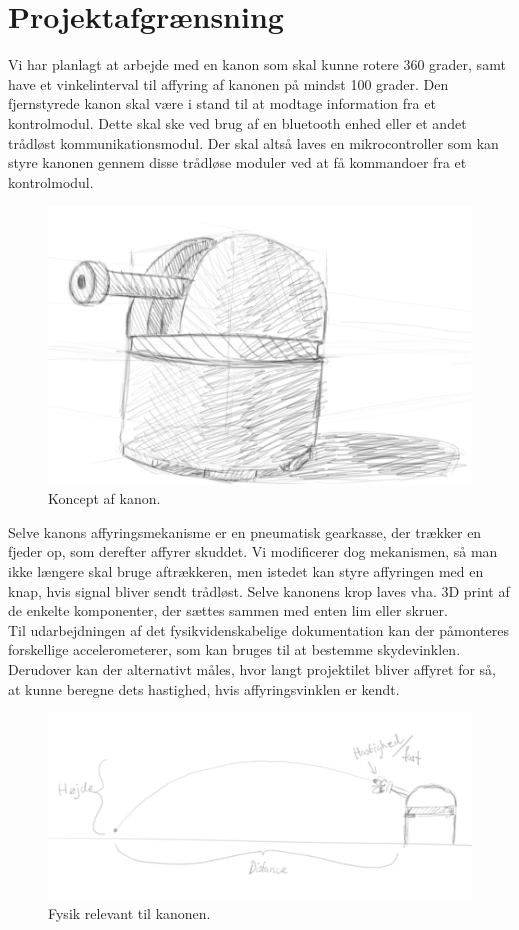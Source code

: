 \section{Projektafgrænsning}

Vi har planlagt at arbejde med en kanon som skal kunne rotere 360 grader, samt have et vinkelinterval til affyring af kanonen på mindst 100 grader. Den fjernstyrede kanon skal være i stand til at modtage information fra et kontrolmodul. Dette skal ske ved brug af en bluetooth enhed eller et andet trådløst kommunikationsmodul. Der skal altså laves en mikrocontroller som kan styre kanonen gennem disse trådløse moduler ved at få kommandoer fra et kontrolmodul.\\

\begin{figure}[H]
\centering
\includegraphics[scale=0.4]{Billeder/Koncept_turret.png}
\caption{Koncept af kanon.}
\label{fig:KonceptKanon}
\end{figure}

Selve kanons affyringsmekanisme er en pneumatisk gearkasse, der trækker en fjeder op, som derefter affyrer skuddet. Vi modificerer dog mekanismen, så man ikke længere skal bruge aftrækkeren, men istedet kan styre affyringen med en knap, hvis signal bliver sendt trådløst. Selve kanonens krop laves vha. 3D print af de enkelte komponenter, der sættes sammen med enten lim eller skruer. \\

Til udarbejdningen af det fysikvidenskabelige dokumentation kan der påmonteres forskellige accelerometerer, som kan bruges til at bestemme skydevinklen. Derudover kan der alternativt måles, hvor langt projektilet bliver affyret for så, at kunne beregne dets hastighed, hvis affyringsvinklen er kendt.

\begin{figure}[H]
\centering
\includegraphics[scale=0.4]{Billeder/Fysik_koncept.png}
\caption{Fysik relevant til kanonen.}
\label{fig:FysikKoncept}
\end{figure}